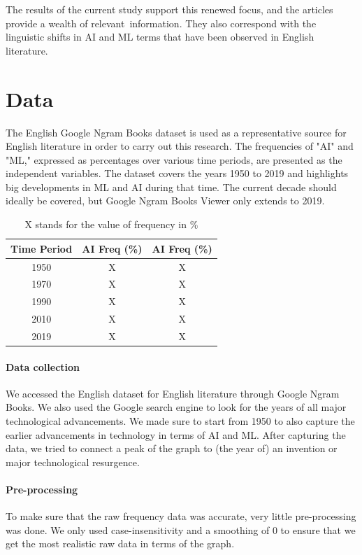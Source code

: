 \documentclass[11pt]{article}
\begin{document}
{The results of the current study support this renewed focus, and the articles provide a wealth of relevant information. They also correspond with the linguistic shifts in AI and ML terms that have been observed in English literature.

\section{Data}

The English Google Ngram Books dataset is used as a representative source for English literature in order to carry out this research. The frequencies of "AI" and "ML," expressed as percentages over various time periods, are presented as the independent variables. The dataset covers the years 1950 to 2019 and highlights big developments in ML and AI during that time. The current decade should ideally be covered, but Google Ngram Books Viewer only extends to 2019.

\begin{table}[hbtp]\centering
\begin{tabular}{|ccc|}
\hline
Time Period & AI Freq (\%) & AI Freq (\%)\\
\hline
1950 & X & X\\
1970 & X & X\\
1990 & X & X\\
2010 & X & X\\
2019 & X & X\\

\hline
\end{tabular}
\caption{X stands for the value of frequency in \%}
\label{tbl:results}
\end{table}

\vspace{5pt}

\paragraph{Data collection} We accessed the English dataset for English literature through Google Ngram Books. We also used the Google search engine to look for the years of all major technological advancements. We made sure to start from 1950 to also capture the earlier advancements in technology in terms of AI and ML. After capturing the data, we tried to connect a peak of the graph to (the year of) an invention or major technological resurgence.


\paragraph{Pre-processing} To make sure that the raw frequency data was accurate, very little pre-processing was done. We only used case-insensitivity and a smoothing of 0 to ensure that we get the most realistic raw data in terms of the graph.



}
\end{document}
